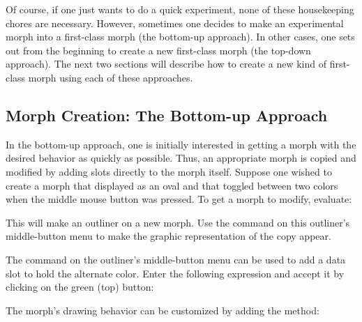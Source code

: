 \documentclass[letterpaper,10pt,english]{sphinxmanual}
\begin{document}
Of course, if one just wants to do a quick experiment, none of these housekeeping chores are necessary. However, sometimes one decides to make an experimental morph into a first-class morph (the bottom-up approach). In other cases, one sets out from the beginning to create a new first-class morph (the top-down approach). The next two sections will describe how to create a new kind of first-class morph using each of these approaches.


\subsection{Morph Creation: The Bottom-up Approach}
\label{\detokenize{morphic:morph-creation-the-bottom-up-approach}}
In the bottom-up approach, one is initially interested in getting a morph with the desired behavior as quickly as possible. Thus, an appropriate morph is copied and modified by adding slots directly to the morph itself. Suppose one wished to create a morph that displayed as an oval and that toggled between two colors when the middle mouse button was pressed. To get a morph to modify, evaluate:

\begin{sphinxVerbatim}[commandchars=\\\{\}]
 
\end{sphinxVerbatim}

This will make an outliner on a new morph. Use the  command on this outliner's middle-button menu to make the graphic representation of the copy appear.

The  command on the outliner's middle-button menu can be used to add a data slot to hold the alternate color. Enter the following expression and accept it by clicking on the green (top) button:

\begin{sphinxVerbatim}[commandchars=\\\{\}]
    
\end{sphinxVerbatim}

The morph's drawing behavior can be customized by adding the method:

\begin{sphinxVerbatim}[commandchars=\\\{\}]
   
      
         
         
         
\end{sphinxVerbatim}
\end{document}
